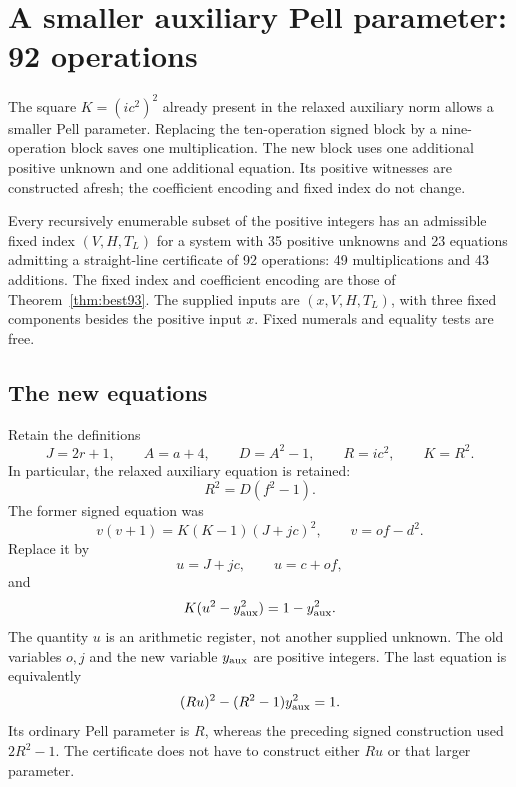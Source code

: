 \section{A smaller auxiliary Pell parameter: 92 operations}
\label{sec:half-parameter-pell}

The square $K=(ic^2)^2$ already present in the relaxed auxiliary norm
allows a smaller Pell parameter. Replacing the ten-operation signed
block by a nine-operation block saves one multiplication. The new
block uses one additional positive unknown and one additional equation.
Its positive witnesses are constructed afresh; the coefficient encoding
and fixed index do not change.

\begin{theorem}\label{thm:best92}
Every recursively enumerable subset of the positive integers has an
admissible fixed index $(V,H,T_L)$ for a system with 35 positive
unknowns and 23 equations admitting a straight-line certificate of
92 operations: 49 multiplications and 43 additions. The fixed index
and coefficient encoding are those of Theorem~\ref{thm:best93}.
The supplied inputs are $(x,V,H,T_L)$, with three fixed components
besides the positive input $x$. Fixed numerals and equality tests
are free.
\end{theorem}

\subsection{The new equations}

Retain the definitions
\begin{equation}\label{eq:half-pell-parameters}
 J=2r+1,\qquad A=a+4,\qquad D=A^2-1,\qquad
 R=ic^2,\qquad K=R^2.
\end{equation}
In particular, the relaxed auxiliary equation is retained:
\begin{equation}\label{eq:half-pell-relaxed}
 R^2=D(f^2-1).
\end{equation}
The former signed equation was
\[
 v(v+1)=K(K-1)(J+jc)^2,\qquad v=of-d^2.
\]
Replace it by
\begin{equation}\label{eq:half-pell-linear}
 u=J+jc,\qquad u=c+of,
\end{equation}
and
\begin{equation}\label{eq:half-pell-norm}
 K(u^2-y_{\rm aux}^2)=1-y_{\rm aux}^2.
\end{equation}
The quantity $u$ is an arithmetic register, not another supplied
unknown. The old variables $o,j$ and the new variable $y_{\rm aux}$
are positive integers. The last equation is equivalently
\begin{equation}\label{eq:half-pell-standard-norm}
 (Ru)^2-(R^2-1)y_{\rm aux}^2=1.
\end{equation}
Its ordinary Pell parameter is $R$, whereas the preceding signed
construction used $2R^2-1$. The certificate does not have to
construct either $Ru$ or that larger parameter.


